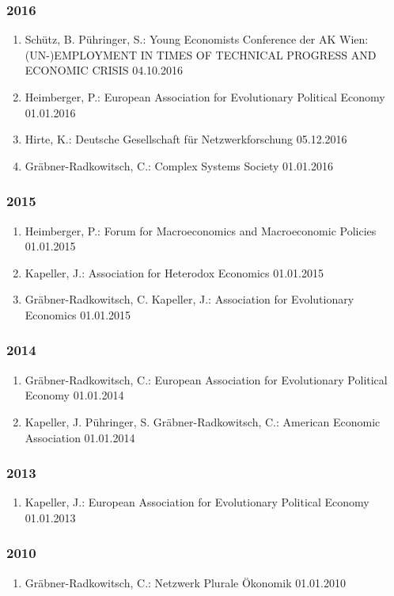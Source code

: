 \subsubsection*{2016}
\begin{enumerate}
	\item Schütz, B. Pühringer, S.: Young Economists Conference der AK Wien: (UN-)EMPLOYMENT IN TIMES OF TECHNICAL PROGRESS AND ECONOMIC CRISIS 04.10.2016
	\item Heimberger, P.: European Association for Evolutionary Political Economy 01.01.2016
	\item Hirte, K.: Deutsche Gesellschaft für Netzwerkforschung 05.12.2016
	\item Gräbner-Radkowitsch, C.: Complex Systems Society 01.01.2016
\end{enumerate}
\subsubsection*{2015}
\begin{enumerate}
	\item Heimberger, P.: Forum for Macroeconomics and Macroeconomic Policies 01.01.2015
	\item Kapeller, J.: Association for Heterodox Economics 01.01.2015
	\item Gräbner-Radkowitsch, C. Kapeller, J.: Association for Evolutionary Economics 01.01.2015
\end{enumerate}
\subsubsection*{2014}
\begin{enumerate}
	\item Gräbner-Radkowitsch, C.: European Association for Evolutionary Political Economy 01.01.2014
	\item Kapeller, J. Pühringer, S. Gräbner-Radkowitsch, C.: American Economic Association 01.01.2014
\end{enumerate}
\subsubsection*{2013}
\begin{enumerate}
	\item Kapeller, J.: European Association for Evolutionary Political Economy 01.01.2013
\end{enumerate}
\subsubsection*{2010}
\begin{enumerate}
	\item Gräbner-Radkowitsch, C.: Netzwerk Plurale Ökonomik 01.01.2010
\end{enumerate}
